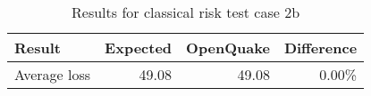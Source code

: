 \begin{table}[htbp]

\centering
\begin{tabular}{ l r r r }

\hline
\rowcolor{anti-flashwhite}
\bf{Result} & \bf{Expected} & \bf{OpenQuake} & \bf{Difference}\\
\hline
Average loss & 49.08 & 49.08 & 0.00\% \\
\hline
\end{tabular}

\caption{Results for classical risk test case 2b}
\label{tab:result-cr-2b}
\end{table}